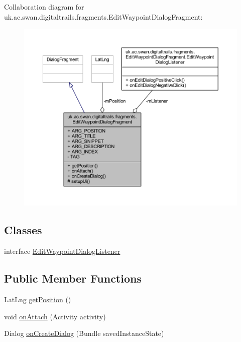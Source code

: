 Collaboration diagram for uk.\+ac.\+swan.\+digitaltrails.\+fragments.\+Edit\+Waypoint\+Dialog\+Fragment\+:
\nopagebreak
\begin{figure}[H]
\begin{center}
\leavevmode
\includegraphics[width=350pt]{classuk_1_1ac_1_1swan_1_1digitaltrails_1_1fragments_1_1_edit_waypoint_dialog_fragment__coll__graph}
\end{center}
\end{figure}
\subsection*{Classes}
\begin{DoxyCompactItemize}
\item 
interface \hyperlink{interfaceuk_1_1ac_1_1swan_1_1digitaltrails_1_1fragments_1_1_edit_waypoint_dialog_fragment_1_1_edit_waypoint_dialog_listener}{Edit\+Waypoint\+Dialog\+Listener}
\end{DoxyCompactItemize}
\subsection*{Public Member Functions}
\begin{DoxyCompactItemize}
\item 
Lat\+Lng \hyperlink{classuk_1_1ac_1_1swan_1_1digitaltrails_1_1fragments_1_1_edit_waypoint_dialog_fragment_a8aad680d20ef7672832cf6f3e8a33c17}{get\+Position} ()
\item 
void \hyperlink{classuk_1_1ac_1_1swan_1_1digitaltrails_1_1fragments_1_1_edit_waypoint_dialog_fragment_a99a6715b62dbfc7b90f968b3d20192b8}{on\+Attach} (Activity activity)
\item 
Dialog \hyperlink{classuk_1_1ac_1_1swan_1_1digitaltrails_1_1fragments_1_1_edit_waypoint_dialog_fragment_a315436a410c9a7655ecfb756096f0a2b}{on\+Create\+Dialog} (Bundle saved\+Instance\+State)
\end{DoxyCompactItemize}
